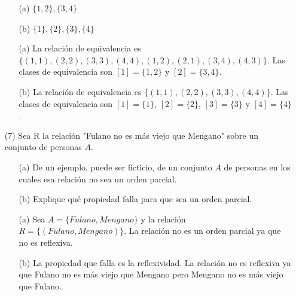 \documentclass[10pt]{article}
\begin{document}
\begin{enumerate}
    \begin{itemize}
        \item[(a)] $\{1, 2\}, \{3, 4\}$
        \item[(b)] $\{1\}, \{2\}, \{3\}, \{4\}$
    \end{itemize}
    \begin{sol}
        \begin{itemize}
            \item[(a)] La relación de equivalencia es $\{(1, 1), (2, 2), (3, 3), (4, 4), (1, 2), (2, 1), (3, 4), (4, 3)\}$. Las clases de equivalencia son $[1]=\{1, 2\}$ y $[2]=\{3, 4\}$.
            \item[(b)] La relación de equivalencia es $\{(1, 1), (2, 2), (3, 3), (4, 4)\}$. Las clases de equivalencia son $[1]=\{1\}$, $[2]=\{2\}$, $[3]=\{3\}$ y $[4]=\{4\}$.
        \end{itemize}
    \end{sol}
    \item[(7)] Sea R la relación "Fulano no es más viejo que Mengano" sobre un conjunto de personas $A$.
    \begin{itemize}
        \item[(a)] De un ejemplo, puede ser ficticio, de un conjunto $A$ de personas en los cuales esa relación no sea un orden parcial.
        \item[(b)] Explique qué propiedad falla para que sea un orden parcial.
    \end{itemize}
    \begin{sol}
        \begin{itemize}
            \item[(a)] Sea $A=\{Fulano, Mengano\}$ y la relación $R=\{(Fulano, Mengano)\}$. La relación no es un orden parcial ya que no es reflexiva.
            \item[(b)] La propiedad que falla es la reflexividad. La relación no es reflexiva ya que Fulano no es más viejo que Mengano pero Mengano no es más viejo que Fulano.
        \end{itemize}
    \end{sol}
\end{enumerate}
\end{document}
